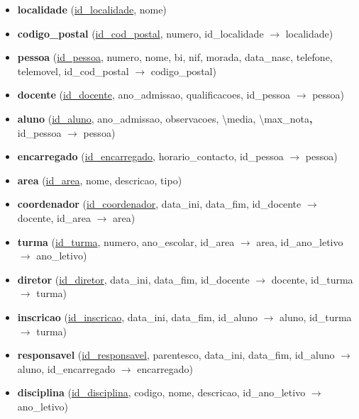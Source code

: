 \documentclass[12pt,a4paper,reqno]{report}
\numberwithin{figure}{section}
\numberwithin{equation}{section}
\begin{document}
\begin{itemize}

\item \textbf{localidade} (\underline{id\_localidade}, nome)

\item \textbf{codigo\_postal} (\underline {id\_cod\_postal}, numero, id\_localidade $\rightarrow$ localidade)

\item \textbf{pessoa} (\underline{id\_pessoa}, numero, nome, bi, nif, morada, data\_nasc, telefone, telemovel, id\_cod\_postal $\rightarrow$ codigo\_postal)

\item \textbf{docente} (\underline{id\_docente}, ano\_admissao, qualificacoes, id\_pessoa $\rightarrow$ pessoa)

\item \textbf{aluno} (\underline{id\_aluno}, ano\_admissao, observacoes, \textbackslash media, \textbackslash max\_nota\textbf{,} id\_pessoa $\rightarrow$ pessoa)

\item \textbf{encarregado} (\underline{id\_encarregado}, horario\_contacto, id\_pessoa $\rightarrow$ pessoa)

\item \textbf{area} (\underline{id\_area}, nome, descricao, tipo)

\item \textbf{coordenador} (\underline{id\_coordenador}, data\_ini, data\_fim, id\_docente $\rightarrow$ docente, id\_area $\rightarrow$ area)

\item \textbf{turma} (\underline{id\_turma}, numero, ano\_escolar, id\_area $\rightarrow$ area, id\_ano\_letivo $\rightarrow$ ano\_letivo)

\item \textbf{diretor} (\underline{id\_diretor}, data\_ini, data\_fim, id\_docente $\rightarrow$ docente, id\_turma $\rightarrow$ turma)

\item \textbf{inscricao} (\underline{id\_inscricao}, data\_ini, data\_fim, id\_aluno $\rightarrow$ aluno, id\_turma $\rightarrow$ turma)

\item \textbf{responsavel} (\underline{id\_responsavel}, parentesco, data\_ini, data\_fim, id\_aluno $\rightarrow$ aluno, id\_encarregado $\rightarrow$ encarregado)

\item \textbf{disciplina} (\underline{id\_disciplina}, codigo, nome, descricao, id\_ano\_letivo $\rightarrow$ ano\_letivo)


\end{itemize}
\end{document}
